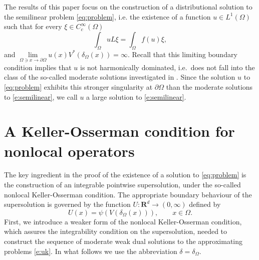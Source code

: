 \documentclass[a4paper,12pt,draft]{article}
\theoremstyle{plain}
\theoremstyle{definition}
\numberwithin{equation}{section}
\newcommand\R{\mathbf{R}}
\newcommand{\1}{1}
\begin{document}
The results of this paper focus on the construction of a distributional solution to the semilinear problem \eqref{eq:problem}, i.e. the existence of a function $u\in L^1(\Omega)$ such that for every $\xi\in C_c^\infty(\Omega)$
\[
\int_{\Omega} u L\xi=\int_{\Omega} f(u)\xi, 
\]
and $\lim\limits_{\Omega\ni x\to\partial\Omega} u(x)V^*(\delta_\Omega(x))=\infty$. Recall that this limiting boundary condition implies that $u$ is not harmonically dominated, i.e.~does not fall into the class of the so-called moderate solutions investigated in \cite{BVW}. Since the solution $u$ to \eqref{eq:problem} exhibits this stronger singularity at $\partial \Omega$ than the moderate solutions to \eqref{e:semilinear},  we call $u$ a large solution to \eqref{e:semilinear}. 


\section{A Keller-Osserman condition for nonlocal operators}\label{sec-KO}

The key ingredient in the proof of the existence of a solution to \eqref{eq:problem} is the construction of an integrable pointwise supersolution, under the so-called nonlocal Keller-Osserman condition.
The appropriate boundary behaviour of the supersolution is governed by the function $U:\R^d\to(0,\infty)$ defined by
\[
	U(x)=\psi\left(V(\delta_\Omega(x))\right), \qquad x\in\Omega.
\] 
First, we introduce a weaker form of the nonlocal Keller-Osserman condition, which assures the integrability condition on the supersolution, needed to construct the sequence of moderate weak dual solutions to the approximating problems \eqref{e:uk}. In what follows we use the abbreviation $\delta=\delta_\Omega$.
\end{document}
